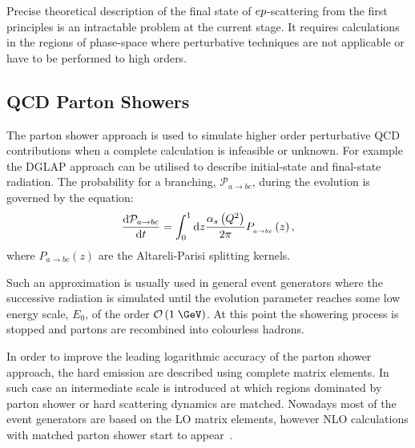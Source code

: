 Precise theoretical description of the final state of $\mbox{$e p$}$-scattering from the first principles is an intractable problem at the current stage. It requires calculations in the regions of phase-space where perturbative techniques are not applicable or have to be performed to high orders.
\subsection{QCD Parton Showers}
The parton shower approach is used to simulate higher order perturbative QCD contributions when a complete calculation is infeasible or unknown. For example the DGLAP approach can be utilised to describe initial-state and final-state radiation. The probability for a branching, $\mathcal{P}_{a\rightarrow bc}$, during the evolution is governed by the equation:
\begin{equation}
\frac{\mathrm{d}\mathcal{P}_{a\rightarrow bc}}{\mathrm{d}t} = \int_0^1{\mathrm{d}z\frac{\mbox{$\alpha_{s}$}\left(\mbox{${Q^2}$}\right)}{2\pi}P_{_{a\rightarrow bc}}}\left(z\right),
\end{equation}
where $P_{a\rightarrow bc}\left(z\right)$ are the Altareli-Parisi splitting kernels.

Such an approximation is usually used in general event generators where the successive radiation is simulated until the evolution parameter reaches some low energy scale, $E_0$, of the order $\mathcal{O}\left(1\;\GeV\right)$. At this point the showering process is stopped and partons are recombined into colourless hadrons.

In order to improve the leading logarithmic accuracy of the parton shower approach, the hard emission are described using complete matrix elements. In such case an intermediate scale is introduced at which regions dominated by parton shower or hard scattering dynamics are matched. Nowadays most of the event generators are based on the LO matrix elements, however NLO calculations with matched parton shower start to appear~\cite{powheg, mcatnlo}.

